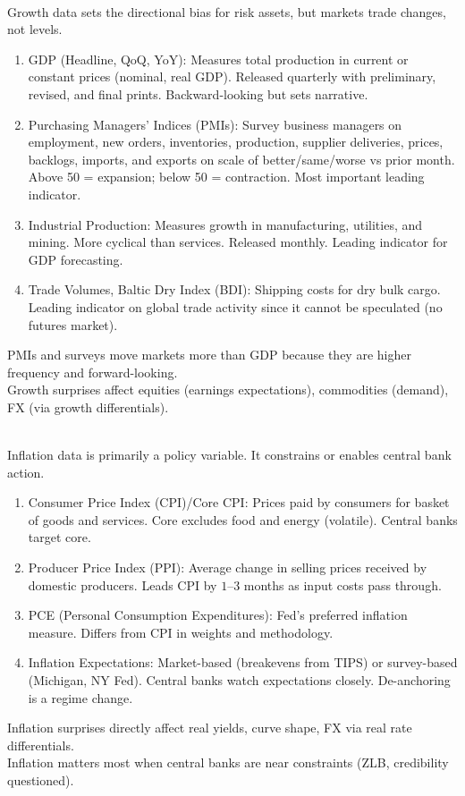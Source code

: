 \documentclass[a4paper,oneside,openany]{book}
\begin{document}
\begin{remark} \\
Growth data sets the directional bias for risk assets, but markets trade changes, not levels.
\begin{enumerate}[label=\roman*.]
\setlength{\itemsep}{0pt}
\item GDP (Headline, QoQ, YoY): Measures total production in current or constant prices (nominal, real GDP). Released quarterly with preliminary, revised, and final prints. Backward-looking but sets narrative.
\item Purchasing Managers' Indices (PMIs): Survey business managers on employment, new orders, inventories, production, supplier deliveries, prices, backlogs, imports, and exports on scale of better/same/worse vs prior month. Above 50 = expansion; below 50 = contraction. Most important leading indicator.
\item Industrial Production: Measures growth in manufacturing, utilities, and mining. More cyclical than services. Released monthly. Leading indicator for GDP forecasting.
\item Trade Volumes, Baltic Dry Index (BDI): Shipping costs for dry bulk cargo. Leading indicator on global trade activity since it cannot be speculated (no futures market).
\end{enumerate}
PMIs and surveys move markets more than GDP because they are higher frequency and forward-looking.\\
Growth surprises affect equities (earnings expectations), commodities (demand), FX (via growth differentials).
\end{remark}

\begin{remark} \\
Inflation data is primarily a policy variable. It constrains or enables central bank action.
\begin{enumerate}[label=\roman*.]
\setlength{\itemsep}{0pt}
\item Consumer Price Index (CPI)/Core CPI: Prices paid by consumers for basket of goods and services. Core excludes food and energy (volatile). Central banks target core.
\item Producer Price Index (PPI): Average change in selling prices received by domestic producers. Leads CPI by $1$--$3$ months as input costs pass through.
\item PCE (Personal Consumption Expenditures): Fed's preferred inflation measure. Differs from CPI in weights and methodology.
\item Inflation Expectations: Market-based (breakevens from TIPS) or survey-based (Michigan, NY Fed). Central banks watch expectations closely. De-anchoring is a regime change.
\end{enumerate}
Inflation surprises directly affect real yields, curve shape, FX via real rate differentials.\\
Inflation matters most when central banks are near constraints (ZLB, credibility questioned).
\end{remark}
\end{document}
